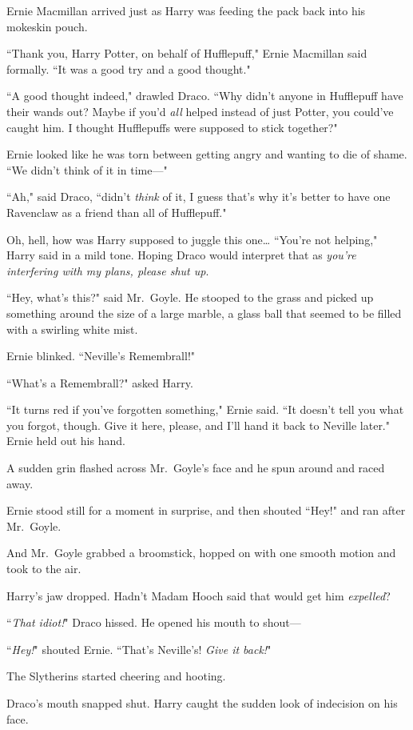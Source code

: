 Ernie Macmillan arrived just as Harry was feeding the pack back into his mokeskin pouch.

``Thank you, Harry Potter, on behalf of Hufflepuff," Ernie Macmillan said formally. ``It was a good try and a good thought."

``A good thought indeed," drawled Draco. ``Why didn't anyone in Hufflepuff have their wands out? Maybe if you'd \emph{all} helped instead of just Potter, you could've caught him. I thought Hufflepuffs were supposed to stick together?"

Ernie looked like he was torn between getting angry and wanting to die of shame. ``We didn't think of it in time—"

``Ah," said Draco, ``didn't \emph{think} of it, I guess that's why it's better to have one Ravenclaw as a friend than all of Hufflepuff."

Oh, hell, how was Harry supposed to juggle this one{\ldots} ``You're not helping," Harry said in a mild tone. Hoping Draco would interpret that as \emph{you're interfering with my plans, please shut up}.

``Hey, what's this?" said Mr.~Goyle. He stooped to the grass and picked up something around the size of a large marble, a glass ball that seemed to be filled with a swirling white mist.

Ernie blinked. ``Neville's Remembrall!"

``What's a Remembrall?" asked Harry.

``It turns red if you've forgotten something," Ernie said. ``It doesn't tell you what you forgot, though. Give it here, please, and I'll hand it back to Neville later." Ernie held out his hand.

A sudden grin flashed across Mr.~Goyle's face and he spun around and raced away.

Ernie stood still for a moment in surprise, and then shouted ``Hey!" and ran after Mr.~Goyle.

And Mr.~Goyle grabbed a broomstick, hopped on with one smooth motion and took to the air.

Harry's jaw dropped. Hadn't Madam Hooch said that would get him \emph{expelled}?

``\emph{That idiot!}" Draco hissed. He opened his mouth to shout—

``\emph{Hey!}" shouted Ernie. ``That's Neville's! \emph{Give it back!}"

The Slytherins started cheering and hooting.

Draco's mouth snapped shut. Harry caught the sudden look of indecision on his face.

